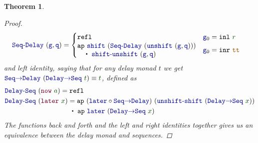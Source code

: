 \documentclass[twoside,11pt,openright]{report}
\theoremstyle{plain} %
\newtheorem{thm}{Theorem}[section]
\theoremstyle{definition}
\theoremstyle{remark}
\newcommand*{\term}[1]{\textcolor{green!30!black}{#1}} %
\newcommand*{\constant}[1]{\textcolor{orange!60!black}{\ensuremath{\mathtt{#1}}}}
\newcommand*{\function}[1]{\textcolor{blue!60!black}{\ensuremath{\mathtt{#1}}}}
\newcommand*{\constructor}[1]{\textcolor{purple!60!black}{\ensuremath{\mathtt{#1}}}}
\newcommand{\ct}{%
  \mathchoice{\mathbin{\raisebox{0.5ex}{$\displaystyle\centerdot$}}}%
             {\mathbin{\raisebox{0.5ex}{$\centerdot$}}}%
             {\mathbin{\raisebox{0.25ex}{$\scriptstyle\,\centerdot\,$}}}%
             {\mathbin{\raisebox{0.1ex}{$\scriptscriptstyle\,\centerdot\,$}}}
}
\begin{document}
\begin{thm}
\begin{proof}
\begin{equation}
      \begin{aligned}
        \function{Seq\text{-}Delay}&~(\function{g},\function{q}) = \begin{cases} \mathtt{refl}  & \function{g}_0 = \mathtt{inl}~\term{r} \\ \begin{aligned} &\mathtt{ap}~\function{shift}~(\function{Seq\text{-}Delay}~(\function{unshift}~(\function{g} , \function{q}))) \\&\quad\ct~\function{shift\text{-}unshift}~(\function{g} , \function{q}) \end{aligned} & \function{g}_0 = \mathtt{inr}~\constant{tt} \end{cases}
      \end{aligned}
    \end{equation}
    and left identity, saying that for any delay monad \(t\) we get \(\function{Seq{\rightarrow}Delay}~(\function{Delay{\rightarrow}Seq}~\term{t}) \equiv \term{t}\), defined as
    \begin{equation}
      \begin{aligned}
        \function{Delay\text{-}Seq}&~(\constructor{now}~\term{a}) = \mathtt{refl} \\
        \function{Delay\text{-}Seq}&~(\constructor{later}~\term{x}) = \mathtt{ap}~(\function{later} \circ \function{Seq{\rightarrow}Delay})~(\function{unshift\text{-}shift}~(\function{Delay{\rightarrow}Seq}~\term{x})) \\ &\qquad\qquad\quad\ct~\mathtt{ap}~\function{later}~(\function{Delay{\rightarrow}Seq}~\term{x})
      \end{aligned}
    \end{equation}
    The functions back and forth and the left and right identities together gives us an equivalence between the delay monad and sequences.
  \end{proof}
\end{thm}
\end{document}
